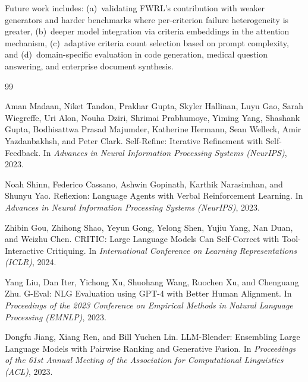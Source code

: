 \documentclass[11pt]{article}
\newcommand{\fwrl}{\textsc{FWRL}}
\begin{document}
Future work includes: (a)~validating \fwrl{}'s contribution with weaker generators and harder benchmarks where per-criterion failure heterogeneity is greater, (b)~deeper model integration via criteria embeddings in the attention mechanism, (c)~adaptive criteria count selection based on prompt complexity, and (d)~domain-specific evaluation in code generation, medical question answering, and enterprise document synthesis.



\begin{thebibliography}{99}

Aman Madaan, Niket Tandon, Prakhar Gupta, Skyler Hallinan, Luyu Gao, Sarah Wiegreffe, Uri Alon, Nouha Dziri, Shrimai Prabhumoye, Yiming Yang, Shashank Gupta, Bodhisattwa Prasad Majumder, Katherine Hermann, Sean Welleck, Amir Yazdanbakhsh, and Peter Clark.
\newblock Self-Refine: Iterative Refinement with Self-Feedback.
\newblock In \emph{Advances in Neural Information Processing Systems (NeurIPS)}, 2023.

Noah Shinn, Federico Cassano, Ashwin Gopinath, Karthik Narasimhan, and Shunyu Yao.
\newblock Reflexion: Language Agents with Verbal Reinforcement Learning.
\newblock In \emph{Advances in Neural Information Processing Systems (NeurIPS)}, 2023.

Zhibin Gou, Zhihong Shao, Yeyun Gong, Yelong Shen, Yujiu Yang, Nan Duan, and Weizhu Chen.
\newblock CRITIC: Large Language Models Can Self-Correct with Tool-Interactive Critiquing.
\newblock In \emph{International Conference on Learning Representations (ICLR)}, 2024.

Yang Liu, Dan Iter, Yichong Xu, Shuohang Wang, Ruochen Xu, and Chenguang Zhu.
\newblock G-Eval: NLG Evaluation using GPT-4 with Better Human Alignment.
\newblock In \emph{Proceedings of the 2023 Conference on Empirical Methods in Natural Language Processing (EMNLP)}, 2023.

Dongfu Jiang, Xiang Ren, and Bill Yuchen Lin.
\newblock LLM-Blender: Ensembling Large Language Models with Pairwise Ranking and Generative Fusion.
\newblock In \emph{Proceedings of the 61st Annual Meeting of the Association for Computational Linguistics (ACL)}, 2023.


\end{thebibliography}
\end{document}
